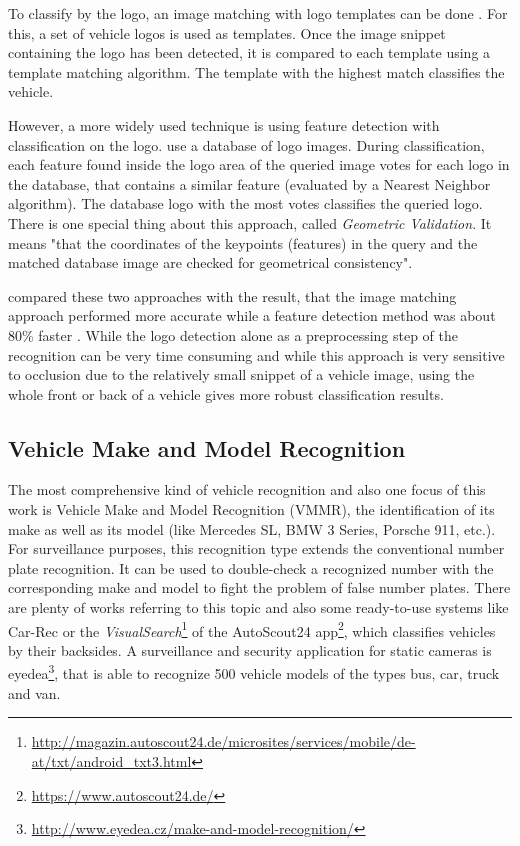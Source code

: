 To classify by the logo, an image matching with logo templates can be done \citep{jain2015car} \citep{wang2007fast}. For this, a set of vehicle logos is used as templates. Once the image snippet containing the logo has been detected, it is compared to each template using a template matching algorithm. The template with the highest match classifies the vehicle.

However, a more widely used technique is using feature detection with classification on the logo. \citeauthor{psyllos2010vehicle} use a database of logo images. During classification, each feature found inside the logo area of the queried image votes for each logo in the database, that contains a similar feature (evaluated by a Nearest Neighbor algorithm). The database logo with the most votes classifies the queried logo. There is one special thing about this approach, called \emph{Geometric Validation}. It means "that the coordinates of the keypoints (features) in the query and the matched database image are checked for geometrical consistency".

\citeauthor{rezaeivehicle} compared these two approaches with the result, that the image matching approach performed more accurate while a feature detection method was about 80\% faster \citep{rezaeivehicle}. While the logo detection alone as a preprocessing step of the recognition can be very time consuming \citep{siddiqui2015robust} and while this approach is very sensitive to occlusion due to the relatively small snippet of a vehicle image, using the whole front or back of a vehicle gives more robust classification results.

\subsection{Vehicle Make and Model Recognition}\label{sec:vmmrStateOfTheArt}
The most comprehensive kind of vehicle recognition and also one focus of this work is Vehicle Make and Model Recognition (VMMR), the identification of its make as well as its model (like Mercedes SL, BMW 3 Series, Porsche 911, etc.). For surveillance purposes, this recognition type extends the conventional number plate recognition. It can be used to double-check a recognized number with the corresponding make and model to fight the problem of false number plates. There are plenty of works referring to this topic and also some ready-to-use systems like Car-Rec \citep{jang2011car} or the \emph{VisualSearch}\footnote{\url{http://magazin.autoscout24.de/microsites/services/mobile/de-at/txt/android_txt3.html}} of the AutoScout24 app\footnote{\url{https://www.autoscout24.de/}}, which classifies vehicles by their backsides.
A surveillance and security application for static cameras is eyedea\footnote{\url{http://www.eyedea.cz/make-and-model-recognition/}}, that is able to recognize 500 vehicle models of the types bus, car, truck and van.

